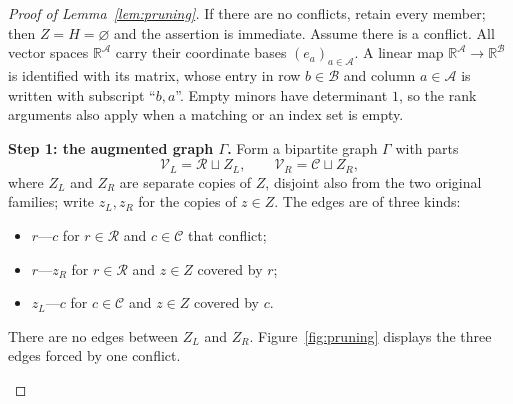 \documentclass[11pt]{article}
\theoremstyle{remark}
\newcommand{\R}{\mathbb R}
\newcommand{\step}[1]{\par\medskip\noindent\textbf{#1}\enspace}
\begin{document}
\begin{proof}[Proof of Lemma~\ref{lem:pruning}]
If there are no conflicts, retain every member; then $Z=H=\varnothing$
and the assertion is immediate.  Assume there is a conflict.  All vector
spaces $\R^{\mathcal A}$ carry their coordinate bases
$(e_a)_{a\in\mathcal A}$.  A linear map
$\R^{\mathcal A}\to\R^{\mathcal B}$ is identified with its matrix, whose
entry in row $b\in\mathcal B$ and column $a\in\mathcal A$ is written with
subscript ``$b,a$''.  Empty minors have determinant $1$, so the rank
arguments also apply when a matching or an index set is empty.

\step{Step 1: the augmented graph $\Gamma$.}
Form a bipartite graph $\Gamma$ with parts
\[
 \mathcal V_L=\mathcal R\sqcup Z_L,
 \qquad
 \mathcal V_R=\mathcal C\sqcup Z_R,
\]
where $Z_L$ and $Z_R$ are separate copies of $Z$, disjoint also from the
two original families; write $z_L,z_R$ for the copies of $z\in Z$.
The edges are of three kinds:
\begin{itemize}[nosep]
\item $r$---$c$ for $r\in\mathcal R$ and $c\in\mathcal C$ that conflict;
\item $r$---$z_R$ for $r\in\mathcal R$ and $z\in Z$ covered by $r$;
\item $z_L$---$c$ for $c\in\mathcal C$ and $z\in Z$ covered by $c$.
\end{itemize}
There are no edges between $Z_L$ and $Z_R$.
Figure~\ref{fig:pruning} displays the three edges forced by one conflict.

\begin{figure}[!ht]
 \centering


\end{figure}
\end{proof}
\end{document}
